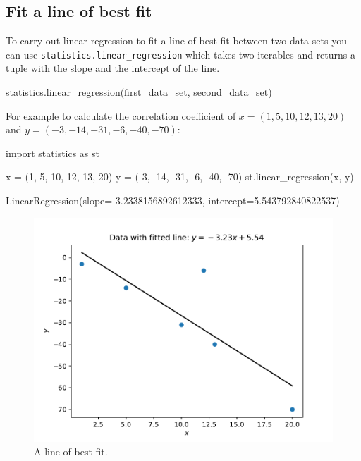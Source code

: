 \subsection{Fit a line of best fit}
\label{\detokenize{tools-for-mathematics/08-statistics/how/main:fit-a-line-of-best-fit}}

To carry out linear regression to fit a line of best fit between two data sets
you can use \texttt{statistics.linear\_regression} which takes two iterables and returns
a tuple with the slope and the intercept of the line.


\begin{pyin}
statistics.linear_regression(first_data_set, second_data_set)
\end{pyin}



For example to calculate the correlation coefficient of \(x=(1, 5, 10, 12, 13, 20)\)
and \(y=(-3, -14, -31, -6, -40, -70)\):




\begin{pyin}
import statistics as st

x = (1, 5, 10, 12, 13, 20)
y = (-3, -14, -31, -6, -40, -70)
st.linear_regression(x, y)
\end{pyin}





\begin{raw}
LinearRegression(slope=-3.2338156892612333, intercept=5.543792840822537)
\end{raw}










\begin{figure}[!hbtp]
\begin{center}
\includegraphics[width=.7\textwidth]{./assets/how_to_fit_a_line/main.pdf}
\end{center}
\caption{A line of best fit.}
\label{fig:how_to_fit_a_line}
\end{figure}







